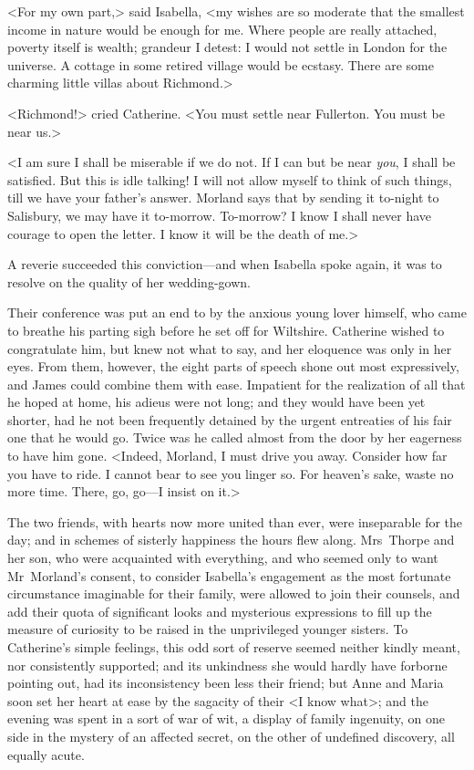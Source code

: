  <For my own part,> said Isabella, <my wishes are so moderate that the smallest income in nature would be enough for me. Where people are really attached, poverty itself is wealth; grandeur I detest: I would not settle in London for the universe. A cottage in some retired village would be ecstasy. There are some charming little villas about Richmond.> 

 <Richmond!> cried Catherine. <You must settle near Fullerton. You must be near us.> 

 <I am sure I shall be miserable if we do not. If I can but be near \textit{you}, I shall be satisfied. But this is idle talking! I will not allow myself to think of such things, till we have your father's answer. Morland says that by sending it to-night to Salisbury, we may have it to-morrow. To-morrow? I know I shall never have courage to open the letter. I know it will be the death of me.> 

 A reverie succeeded this conviction—and when Isabella spoke again, it was to resolve on the quality of her wedding-gown. 

 Their conference was put an end to by the anxious young lover himself, who came to breathe his parting sigh before he set off for Wiltshire. Catherine wished to congratulate him, but knew not what to say, and her eloquence was only in her eyes. From them, however, the eight parts of speech shone out most expressively, and James could combine them with ease. Impatient for the realization of all that he hoped at home, his adieus were not long; and they would have been yet shorter, had he not been frequently detained by the urgent entreaties of his fair one that he would go. Twice was he called almost from the door by her eagerness to have him gone. <Indeed, Morland, I must drive you away. Consider how far you have to ride. I cannot bear to see you linger so. For heaven's sake, waste no more time. There, go, go—I insist on it.> 

 The two friends, with hearts now more united than ever, were inseparable for the day; and in schemes of sisterly happiness the hours flew along. Mrs~Thorpe and her son, who were acquainted with everything, and who seemed only to want Mr~Morland's consent, to consider Isabella's engagement as the most fortunate circumstance imaginable for their family, were allowed to join their counsels, and add their quota of significant looks and mysterious expressions to fill up the measure of curiosity to be raised in the unprivileged younger sisters. To Catherine's simple feelings, this odd sort of reserve seemed neither kindly meant, nor consistently supported; and its unkindness she would hardly have forborne pointing out, had its inconsistency been less their friend; but Anne and Maria soon set her heart at ease by the sagacity of their <I know what>; and the evening was spent in a sort of war of wit, a display of family ingenuity, on one side in the mystery of an affected secret, on the other of undefined discovery, all equally acute. 

